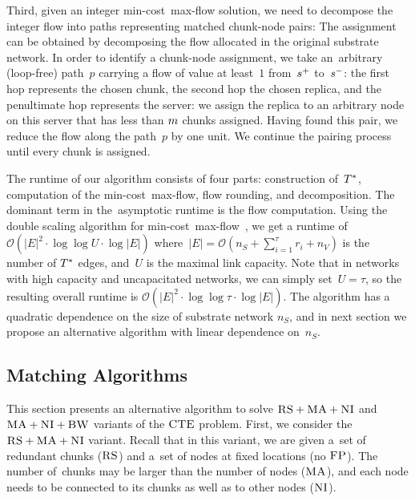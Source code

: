 Third, given an integer min-cost~max-flow solution, we need to decompose
the integer flow into paths
representing matched chunk-node pairs:
The assignment can be obtained by decomposing the flow allocated in the
original substrate network. In order to identify a chunk-node assignment,
we take an~arbitrary (loop-free) path~$p$ carrying a flow of value at least~$1$ from~$s^{+}$ to~$s^{-}$:
the first hop represents the chosen chunk, the second hop the chosen
replica, and the penultimate hop represents the server: we assign
the replica to an arbitrary node on this server that has less than $m$ chunks assigned.
Having found this pair, we reduce the flow
along the path~$p$ by one unit.
We continue the pairing process until every chunk is assigned.

The runtime of our algorithm consists of four parts: construction of~$T^*$,
computation of the min-cost~max-flow, flow rounding, and decomposition. The
dominant term in the~asymptotic runtime is the flow computation.
Using the double scaling algorithm for min-cost~max-flow~\cite{mincostmaxflow-state}, we get a runtime of~$\mathcal{O}(|E|^2 \cdot\log\log U \cdot \log |E|)$
where~$|E| = \mathcal{O}(n_S+\sum_{i=1}^\tau r_i + n_V)$ is the number of $T^*$ edges, and~$U$ is the maximal link capacity. Note that in networks with high capacity
and uncapacitated networks, we can simply set~$U=\tau$, so the resulting overall runtime is $\mathcal{O}(|E|^2 \cdot\log\log \tau \cdot \log |E|)$.
The algorithm has a quadratic dependence on the size of substrate network $n_S$, and in next section we propose an alternative algorithm with linear dependence on~$n_S$.


\subsection{Matching Algorithms}\label{ssec:match}


This section presents an alternative algorithm to solve $\textsc{RS}+\textsc{MA}+\textsc{NI}$ and~$\textsc{MA}+\textsc{NI}+\textsc{BW}$
variants of the $\textsc{CTE}$ problem.
First, we consider the~$\textsc{RS}+\textsc{MA}+\textsc{NI}$ variant.
Recall that in this variant,
we are given a~set of redundant chunks ($\textsc{RS}$) and a~set of nodes
at fixed locations (no $\textsc{FP}$). The number of~chunks may be larger than the number
of nodes ($\textsc{MA}$), and each node needs to be connected
to its chunks as well as to other nodes ($\textsc{NI}$).

